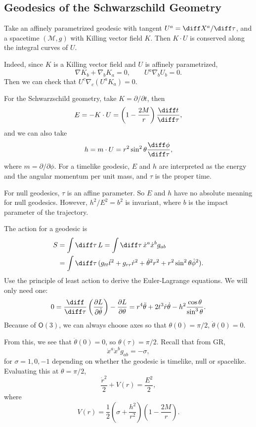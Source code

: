 \documentclass[12pt]{article}
\begin{document}
\subsection{Geodesics of the Schwarzschild Geometry}%
\label{sub:gds}

Take an affinely parametrized geodesic with tangent $U^a = \diff X^a/\diff \tau$, and a spacetime $(\mathcal{M}, g)$ with Killing vector field $K$. Then $K \cdot U$ is conserved along the integral curves of $U$.

Indeed, since $K$ is a Killing vector field and $U$ is affinely parametrized,
\[
\nabla K_b + \nabla_b K_a = 0, \qquad U^a \nabla_b U_b = 0.
\]
Then we can check that $U^{c} \nabla_c (U^a K_a) = 0$.

For the Schwarzschild geometry, take $K = \partial/\partial t$, then
\[
E = - K \cdot U = \left(1 - \frac{2M}{r} \right) \frac{\diff t}{ \diff \tau},
\]
and we can also take
\[
h = m \cdot U = r^2 \sin^2 \theta \frac{\diff \phi}{\diff \tau},
\]
where $m = \partial/\partial \phi$. For a timelike geodesic, $E$ and $h$ are interpreted as the energy and the angular momentum per unit mass, and $\tau$ is the proper time.

For null geodesics, $\tau$ is an affine parameter. So $E$ and $h$ have no absolute meaning for null geodesics. However, $h^2/E^2 = b^2$ is invariant, where $b$ is the impact parameter of the trajectory.

The action for a geodesic is
\begin{align*}
	S &= \int \diff \tau \, L = \int \diff \tau \, \dot x^a \dot x^b g_{ab} \\
	  &= \int \diff \tau \, (g_{tt} \dot t^2 + g_{rr} \dot r^2 + \dot \theta^2 r^2 + r^2 \sin^2 \theta \dot \phi^2).
\end{align*}
Use the principle of least action to derive the Euler-Lagrange equations. We will only need one:
\[
0 = \frac{\diff}{\diff \tau} \left( \frac{\partial L}{\partial \dot \theta} \right) - \frac{\partial L}{\partial \theta} = r^{4} \ddot \theta + 2 t^3 \dot r \dot \theta - h^2 \frac{\cos \theta}{\sin^3 \theta}.
\]
Because of $\mathsf{O}(3)$, we can always choose axes so that $\theta(0) = \pi/2$, $\dot \theta(0) = 0$.

From this, we see that $\ddot \theta(0) = 0$, so $\theta(\tau) = \pi/2$. Recall that from GR,
\[
\dot x^a \dot x^b g_{ab} = - \sigma,
\]
for $\sigma = 1, 0, -1$ depending on whether the geodesic is timelike, null or spacelike. Evaluating this at $\theta = \pi/2$,
\[
\frac{\dot r^2}{2} + V(r) = \frac{E^2}{2},
\]
where
\[
V(r) = \frac 12 \left( \sigma + \frac{h^2}{r^2} \right) \left(1 - \frac{2M}{r} \right).
\]
\end{document}
